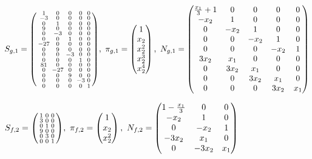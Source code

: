 \documentclass[fleqn]{article}
\begin{document}
$
S_{g,1} = \spmqty{ 1 & 0 & 0 & 0 & 0 \\ -3 & 0 & 0 & 0 & 0 \\ 0 & 1 & 0 & 0 & 0 \\ 9 & 0 & 0 & 0 & 0 \\ 0 & -3 & 0 & 0 & 0 \\ 0 & 0 & 1 & 0 & 0 \\ -27 & 0 & 0 & 0 & 0 \\ 0 & 9 & 0 & 0 & 0 \\ 0 & 0 & -3 & 0 & 0 \\ 0 & 0 & 0 & 1 & 0 \\ 81 & 0 & 0 & 0 & 0 \\ 0 & -27 & 0 & 0 & 0 \\ 0 & 0 & 9 & 0 & 0 \\ 0 & 0 & 0 & -3 & 0 \\ 0 & 0 & 0 & 0 & 1 },~
\pi_{g,1} = \pmqty{
    1       \\
    x_{2}   \\
    x_{2}^2 \\
    x_{2}^3 \\
    x_{2}^4 \\
},~
N_{g,1} = \pmqty{
    \frac{x_{1}}{3}+1 & 0      & 0      & 0      & 0     \\
    -x_{2}            & 1      & 0      & 0      & 0     \\
    0                 & -x_{2} & 1      & 0      & 0     \\
    0                 & 0      & -x_{2} & 1      & 0     \\
    0                 & 0      & 0      & -x_{2} & 1     \\
    3x_{2}            & x_{1}  & 0      & 0      & 0     \\
    0                 & 3x_{2} & x_{1}  & 0      & 0     \\
    0                 & 0      & 3x_{2} & x_{1}  & 0     \\
    0                 & 0      & 0      & 3x_{2} & x_{1} \\
}
$

\bigskip

$
S_{f,2} = \spmqty{ 1 & 0 & 0 \\ 3 & 0 & 0 \\ 0 & 1 & 0 \\ 9 & 0 & 0 \\ 0 & 3 & 0 \\ 0 & 0 & 1 },~
\pi_{f,2} = \pmqty{
    1       \\
    x_{2}   \\
    x_{2}^2 \\
},~
N_{f,2} = \pmqty{
    1-\frac{x_{1}}{3} & 0       & 0     \\
    -x_{2}            & 1       & 0     \\
    0                 & -x_{2}  & 1     \\
    -3x_{2}           & x_{1}   & 0     \\
    0                 & -3x_{2} & x_{1} \\
}
$
\end{document}
